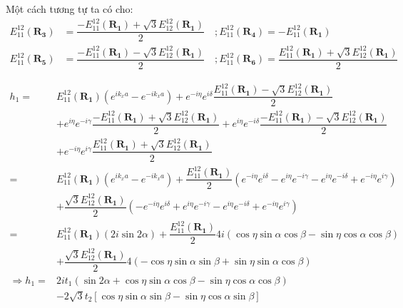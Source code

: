 \documentclass{report}
\begin{document}
Một cách tương tự ta có cho:
\begin{align*}
	E_{11}^{12}(\mathbf{R_3}) & =  \dfrac{ -E_{11}^{12}(\mathbf{R_1}) + \sqrt{3} E_{12}^{12}(\mathbf{R_1})}{2} \quad ;  E_{11}^{12}(\mathbf{R_4}) = - E_{11}^{12}(\mathbf{R_1})                                                 \\
	E_{11}^{12}(\mathbf{R_5}) & =  \dfrac{ -E_{11}^{12}(\mathbf{R_1}) - \sqrt{3} E_{12}^{12}(\mathbf{R_1})}{2} \quad ; E_{11}^{12}(\mathbf{R_6})  =  \dfrac{ E_{11}^{12}(\mathbf{R_1}) + \sqrt{3} E_{12}^{12}(\mathbf{R_1})}{2}
\end{align*}

\begin{align*}
	h_1  =           & E_{11}^{12}(\mathbf{R_1})\left( e^{ik_x a} - e^{-ik_x a} \right) + e^{-i\eta} e^{i\delta} \dfrac{E_{11}^{12}(\mathbf{R_1}) - \sqrt{3}E_{12}^{12}(\mathbf{R_1})}{2}                                                      \\
	                 & + e^{i\eta} e^{-i\gamma} \dfrac{ -E_{11}^{12}(\mathbf{R_1}) + \sqrt{3} E_{12}^{12}(\mathbf{R_1})}{2} + e^{i\eta} e^{-i\delta} \dfrac{ -E_{11}^{12}(\mathbf{R_1}) - \sqrt{3} E_{12}^{12}(\mathbf{R_1})}{2}               \\
	                 & + e^{-i\eta} e^{i\gamma} \dfrac{ E_{11}^{12}(\mathbf{R_1}) + \sqrt{3} E_{12}^{12}(\mathbf{R_1})}{2}                                                                                                                     \\
	=                & E_{11}^{12}(\mathbf{R_1})\left( e^{ik_x a} - e^{-ik_x a} \right) + \dfrac{E_{11}^{12}(\mathbf{R_1})}{2}\left( e^{-i\eta} e^{i\delta} - e^{i\eta} e^{-i\gamma} - e^{i\eta} e^{-i\delta} + e^{-i\eta} e^{i\gamma} \right) \\
	                 & + \dfrac{\sqrt{3}E_{12}^{12}(\mathbf{R_1})}{2}\left( -e^{-i\eta} e^{i\delta} + e^{i\eta} e^{-i\gamma} - e^{i\eta} e^{-i\delta} + e^{-i\eta} e^{i\gamma} \right)                                                         \\
	=                & E_{11}^{12}(\mathbf{R_1})\left( 2i\sin2\alpha \right) + \dfrac{E_{11}^{12}(\mathbf{R_1})}{2}4i(\cos\eta\sin\alpha\cos\beta - \sin\eta\cos\alpha\cos\beta)                                                               \\
	                 & +\dfrac{\sqrt{3}E_{12}^{12}(\mathbf{R_1})}{2}4(-\cos\eta\sin\alpha\sin\beta + \sin\eta\sin\alpha\cos\beta)                                                                                                              \\
	\Rightarrow h_1= & 2 i t_1 (\sin 2\alpha + \cos\eta\sin\alpha\cos\beta -    \sin\eta\cos\alpha\cos\beta )                                                                                                                                  \\
	                 & - 2\sqrt{3}t_2\left[ \cos\eta\sin\alpha\sin\beta - \sin\eta\cos\alpha\sin\beta  \right]
\end{align*}
\end{document}
